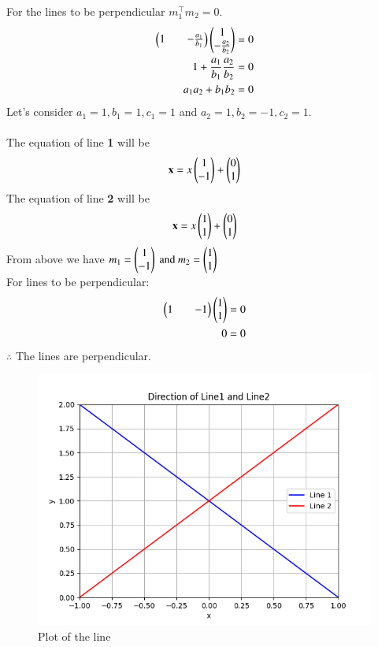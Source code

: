 \documentclass[journal]{IEEEtran}
\begin{document}
For the lines to be perpendicular $m_1^\top m_2 = 0.$\label{eq1.5.37.1}
\begin{align}
    \begin{pmatrix}1 && -\frac{a_1}{b_1}\end{pmatrix}\begin{pmatrix}1 \\ -\frac{a_2}{b_2}\end{pmatrix} = 0\\
    1 + \frac{a_1}{b_1}\frac{a_2}{b_2} = 0\\
    a_1a_2 + b_1b_2 = 0
\end{align}
Let's consider $a_1 = 1, b_1 = 1, c_1 = 1$ and 
$a_2 = 1, b_2 = -1, c_2 = 1. $\\ \\
The equation of line \textbf{1} will be
\begin{align}
\mathbf{x} = x\begin{pmatrix}1 \\ -1\end{pmatrix} + \begin{pmatrix}0 \\ 1\end{pmatrix}
\end{align}
The equation of line \textbf{2} will be
\begin{align}
\mathbf{x} = x\begin{pmatrix}1 \\ 1\end{pmatrix} + \begin{pmatrix}0 \\ 1\end{pmatrix}
\end{align}
From above we have $m_1 = \begin{pmatrix}1 \\-1 \end{pmatrix} \text{ and } m_2 = \begin{pmatrix}1 \\ 1\end{pmatrix} $ \\
For lines to be perpendicular:
\begin{align}
    \begin{pmatrix}1 && -1\end{pmatrix}\begin{pmatrix}1\\ 1\end{pmatrix} = 0 \\
    0 = 0     
\end{align}
 $\therefore$ The lines are perpendicular.

 \begin{figure}[h!]
   \centering
   \includegraphics[width=0.7\linewidth]{figs/fig.png}
   \caption{Plot of the line}
   \label{stemplot}
\end{figure}
\end{document}

